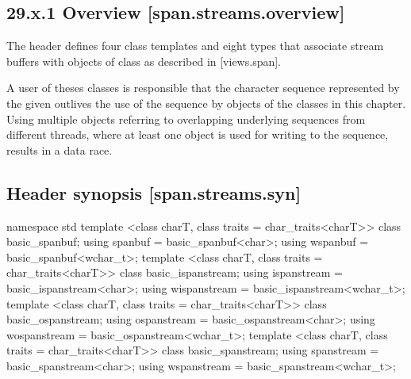 \documentclass[ebook,11pt,article]{memoir}
\begin{document}
\subsection{29.x.1 Overview [span.streams.overview]}
The header  defines four class templates and eight types that associate stream buffers with objects of class  as described in [views.span]. 

\begin{note}
A user of theses classes is responsible that the character sequence represented by the given  outlives the use of the sequence by objects of the classes in this chapter. Using multiple  objects referring to overlapping underlying sequences from different threads, where at least one  object is used for writing to the sequence, results in a data race.
\end{note}

\subsection{Header  synopsis [span.streams.syn]}

\begin{codeblock}
namespace std {
  template <class charT, class traits = char_traits<charT>>
    class basic_spanbuf;
  using spanbuf = basic_spanbuf<char>;
  using wspanbuf = basic_spanbuf<wchar_t>;
  template <class charT, class traits = char_traits<charT>>
    class basic_ispanstream;
  using ispanstream = basic_ispanstream<char>;
  using wispanstream = basic_ispanstream<wchar_t>;
  template <class charT, class traits = char_traits<charT>>
    class basic_ospanstream;
  using ospanstream = basic_ospanstream<char>;
  using wospanstream = basic_ospanstream<wchar_t>;
  template <class charT, class traits = char_traits<charT>>
    class basic_spanstream;
  using spanstream = basic_spanstream<char>;
  using wspanstream = basic_spanstream<wchar_t>;
}
\end{codeblock}
\end{document}
